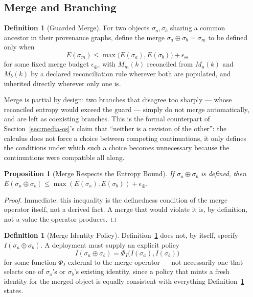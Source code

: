 \documentclass[11pt]{article}
\newtheorem{proposition}[theorem]{Proposition}
\theoremstyle{definition}
\newtheorem{definition}[theorem]{Definition}
\begin{document}
\subsection{Merge and Branching}

\begin{definition}[Guarded Merge]
\label{def:merge}
For two objects $\sigma_a, \sigma_b$ sharing a common ancestor in their provenance graphs, define the merge $\sigma_a \oplus \sigma_b = \sigma_m$ to be defined only when
\[
E(\sigma_m) \leq \max\bigl(E(\sigma_a), E(\sigma_b)\bigr) + \epsilon_\oplus
\]
for some fixed merge budget $\epsilon_\oplus$, with $M_m(k)$ reconciled from $M_a(k)$ and $M_b(k)$ by a declared reconciliation rule wherever both are populated, and inherited directly wherever only one is.
\end{definition}

Merge is partial by design: two branches that disagree too sharply --- whose reconciled entropy would exceed the guard --- simply do not merge automatically, and are left as coexisting branches. This is the formal counterpart of Section~\ref{sec:media-os}'s claim that ``neither is a revision of the other'': the calculus does not force a choice between competing continuations, it only defines the conditions under which such a choice becomes unnecessary because the continuations were compatible all along.

\begin{proposition}[Merge Respects the Entropy Bound]
\label{prop:merge-bound}
If $\sigma_a \oplus \sigma_b$ is defined, then $E(\sigma_a \oplus \sigma_b) \leq \max(E(\sigma_a), E(\sigma_b)) + \epsilon_\oplus$.
\end{proposition}

\begin{proof}
Immediate: this inequality is the definedness condition of the merge operator itself, not a derived fact. A merge that would violate it is, by definition, not a value the operator produces.
\end{proof}

\begin{definition}[Merge Identity Policy]
\label{def:merge-identity-policy}
Definition~\ref{def:merge} does not, by itself, specify $I(\sigma_a \oplus \sigma_b)$. A deployment must supply an explicit policy
\[
I(\sigma_a \oplus \sigma_b) = \Phi_I\big(I(\sigma_a), I(\sigma_b)\big)
\]
for some function $\Phi_I$ external to the merge operator --- not necessarily one that selects one of $\sigma_a$'s or $\sigma_b$'s existing identity, since a policy that mints a fresh identity for the merged object is equally consistent with everything Definition~\ref{def:merge} states.
\end{definition}
\end{document}
